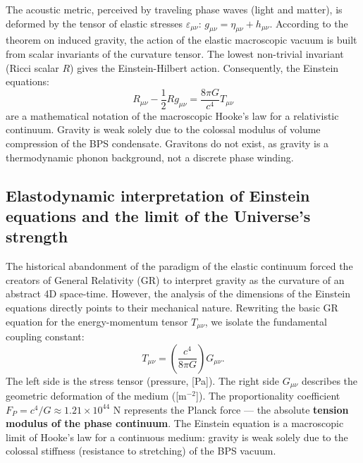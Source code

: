 \documentclass[11pt,a4paper]{article}
\begin{document}
The acoustic metric, perceived by traveling phase waves (light and matter), is deformed by the tensor of elastic stresses $\varepsilon_{\mu\nu}$: $g_{\mu\nu} = \eta_{\mu\nu} + h_{\mu\nu}$. According to the theorem on induced gravity, the action of the elastic macroscopic vacuum is built from scalar invariants of the curvature tensor. The lowest non-trivial invariant (Ricci scalar $R$) gives the Einstein-Hilbert action. Consequently, the Einstein equations:
\begin{equation}
R_{\mu\nu} - \frac{1}{2}R g_{\mu\nu} = \frac{8\pi G}{c^4} T_{\mu\nu}
\end{equation}
are a mathematical notation of the macroscopic Hooke's law for a relativistic continuum. Gravity is weak solely due to the colossal modulus of volume compression of the BPS condensate. Gravitons do not exist, as gravity is a thermodynamic phonon background, not a discrete phase winding.

\subsection{Elastodynamic interpretation of Einstein equations and the limit of the Universe's strength}
The historical abandonment of the paradigm of the elastic continuum forced the creators of General Relativity (GR) to interpret gravity as the curvature of an abstract 4D space-time. However, the analysis of the dimensions of the Einstein equations directly points to their mechanical nature.
Rewriting the basic GR equation for the energy-momentum tensor $T_{\mu\nu}$, we isolate the fundamental coupling constant:
\begin{equation}
	T_{\mu\nu} = \left( \frac{c^4}{8\pi G} \right) G_{\mu\nu}.
\end{equation}
The left side is the stress tensor (pressure, [Pa]). The right side $G_{\mu\nu}$ describes the geometric deformation of the medium ([m$^{-2}$]). The proportionality coefficient $F_P = c^4/G \approx 1.21 \times 10^{44}$ N represents the Planck force — the absolute \textbf{tension modulus of the phase continuum}. The Einstein equation is a macroscopic limit of Hooke's law for a continuous medium: gravity is weak solely due to the colossal stiffness (resistance to stretching) of the BPS vacuum.
\end{document}
